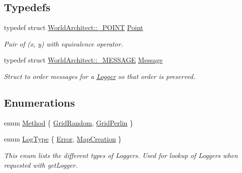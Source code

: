\subsection*{Typedefs}
\begin{DoxyCompactItemize}
\item 
typedef struct \mbox{\hyperlink{struct_world_architect_1_1___p_o_i_n_t}{World\+Architect\+::\+\_\+\+P\+O\+I\+NT}} \mbox{\hyperlink{namespace_world_architect_afe984ab247ed2917d3a738c7d83d33ca}{Point}}
\begin{DoxyCompactList}\small\item\em Pair of (x, y) with equivalence operator. \end{DoxyCompactList}\item 
typedef struct \mbox{\hyperlink{struct_world_architect_1_1___m_e_s_s_a_g_e}{World\+Architect\+::\+\_\+\+M\+E\+S\+S\+A\+GE}} \mbox{\hyperlink{namespace_world_architect_a43ffc83197b30a5636e3dc65fba782a1}{Message}}
\begin{DoxyCompactList}\small\item\em Struct to order messages for a \mbox{\hyperlink{class_world_architect_1_1_logger}{Logger}} so that order is preserved. \end{DoxyCompactList}\end{DoxyCompactItemize}
\subsection*{Enumerations}
\begin{DoxyCompactItemize}
\item 
enum \mbox{\hyperlink{namespace_world_architect_a9bb4333e2d555bf42bf7d14ec2a2ae7b}{Method}} \{ \mbox{\hyperlink{namespace_world_architect_a9bb4333e2d555bf42bf7d14ec2a2ae7ba73e5bbdae306a94e7fa95e797dfeb5dd}{Grid\+Random}}, 
\mbox{\hyperlink{namespace_world_architect_a9bb4333e2d555bf42bf7d14ec2a2ae7ba023523cc51ab3633fe50997121f93a44}{Grid\+Perlin}}
 \}
\item 
enum \mbox{\hyperlink{namespace_world_architect_adf13e54f2c38346ed9d5013cff07fc8e}{Log\+Type}} \{ \mbox{\hyperlink{namespace_world_architect_adf13e54f2c38346ed9d5013cff07fc8ea44dfaf0aee28e2619e6bff75a7d60ba2}{Error}}, 
\mbox{\hyperlink{namespace_world_architect_adf13e54f2c38346ed9d5013cff07fc8ea7af42ff20928d5e5e2650a97d7e277d0}{Map\+Creation}}
 \}
\begin{DoxyCompactList}\small\item\em This enum lists the different types of Loggers. Used for lookup of Loggers when requested with get\+Logger. \end{DoxyCompactList}\end{DoxyCompactItemize}
